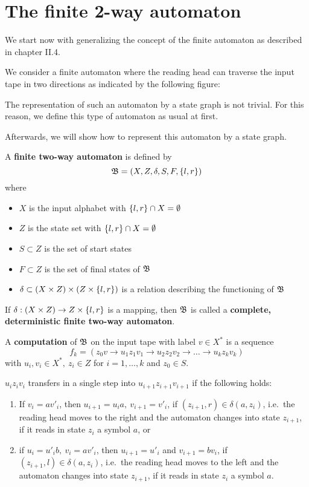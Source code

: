 \section{The finite 2-way automaton}

We start now with generalizing the concept of the finite automaton as described
in chapter II.4.

We consider a finite automaton where the reading head can traverse the input
tape in two directions as indicated by the following figure:

\missingfigure

The representation of such an automaton by a state graph is not trivial. For
this reason, we  define this type of automaton as usual at first.

Afterwards, we will show how to represent this automaton by a state graph.

\begin{definition}
A {\bf finite two-way automaton} is defined by
\[ \mbox{$\mathfrak{B}$} = (X, Z, \delta, S, F, \mbox{$\{l, r\}$}) \]
where 
\begin{itemize}
  \item $X$ is the input alphabet with $\mbox{$\{l, r\}$} \cap X = \emptyset$
  \item $Z$ is the state set with $\mbox{$\{l, r\}$} \cap X = \emptyset$
  \item $S \subset Z$ is the set of start states
  \item $F \subset Z$ is the set of final states of $\mbox{$\mathfrak{B}$}$
  \item $\delta \subset (X \times Z) \times (Z \times \mbox{$\{l, r\}$})$ is a
  relation describing the functioning of $\mbox{$\mathfrak{B}$}$
\end{itemize}

If $\delta : (X \times Z) \to Z \times \mbox{$\{l, r\}$}$ is a mapping, then $\mbox{$\mathfrak{B}$}$
is called a {\bf complete, deterministic finite two-way automaton}.
\end{definition}

\bigskip
\begin{definition}
A {\bf computation} of $\mbox{$\mathfrak{B}$}$ on the input tape with label $v \in X^*$ is a
sequence
\[ f_k = (z_0 v \to u_1 z_1 v_1 \to u_2 z_2 v_2 \to \ldots \to u_k z_k v_k) \]
with $u_i, v_i \in X^*,\ z_i \in Z$ for $i = 1, \ldots, k$ and $z_0 \in S$. 
\end{definition}

$u_i z_i v_i$ transfers in a single step into $u_{i+1} z_{i+1} v_{i+1}$ if the
following holds:

\begin{enumerate}
  \item If $v_i = a v'_i$, then $u_{i+1} = u_i a,\ v_{i+1} = v'_i$, if $(z_{i+1}, r)
\in \delta(a, z_i)$, i.e.\ the reading head moves to the right and the
automaton changes into state $z_{i+1}$, if it reads in state $z_i$ a symbol $a$,
or
\item if $u_i = u'_i b,\ v_i = a v'_i$, then $u_{i+1} = u'_i$ and $v_{i+1} = b
v_i$, if $(z_{i+1}, l) \in \delta(a, z_i)$, i.e.\ the reading head moves to the
left and the automaton changes into state $z_{i+1}$, if it reads in state $z_i$
a symbol $a$.
\end{enumerate}

